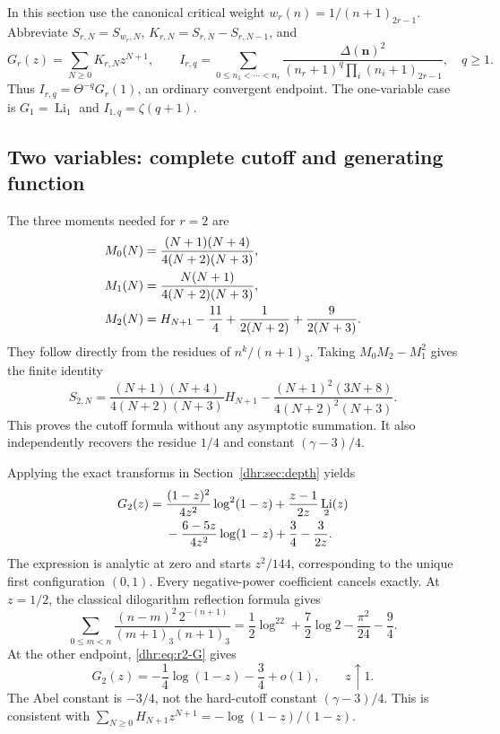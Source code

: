 \documentclass[11pt,letterpaper]{article}
\numberwithin{equation}{section}
\theoremstyle{definition}\newtheorem{definition}[theorem]{Definition}
\theoremstyle{remark}\newtheorem{remark}[theorem]{Remark}
\DeclareMathOperator{\Li}{Li}
\begin{document}
In this section use the canonical critical weight
$w_r(n)=1/(n+1)_{2r-1}$. Abbreviate $S_{r,N}=S_{w_r,N}$,
$K_{r,N}=S_{r,N}-S_{r,N-1}$, and
\begin{equation}\label{dhr:eq:canonical-GI}
 G_r(z)=\sum_{N\geq0}K_{r,N}z^{N+1},\qquad
 I_{r,q}=\sum_{0\leq n_1<\cdots<n_r}
 \frac{\Delta(\bm n)^2}
 {(n_r+1)^q\prod_i(n_i+1)_{2r-1}},\quad q\geq1.
\end{equation}
Thus $I_{r,q}=\Theta^{-q}G_r(1)$, an ordinary convergent endpoint.
The one-variable case is $G_1=\Li_1$ and $I_{1,q}=\zeta(q+1)$.

\subsection{Two variables: complete cutoff and generating function}
The three moments needed for $r=2$ are
\begin{align}
 M_0(N)&=\frac{(N+1)(N+4)}{4(N+2)(N+3)},\notag\\
 M_1(N)&=\frac{N(N+1)}{4(N+2)(N+3)},\notag\\
 M_2(N)&=H_{N+1}-\frac{11}{4}
                      +\frac1{2(N+2)}+\frac9{2(N+3)}.
 \label{dhr:eq:r2-moments}
\end{align}
They follow directly from the residues of $n^k/(n+1)_3$.
Taking $M_0M_2-M_1^2$ gives the finite identity
\begin{equation}\label{dhr:eq:r2-cutoff}
 \boxed{S_{2,N}=
 \frac{(N+1)(N+4)}{4(N+2)(N+3)}H_{N+1}
 -\frac{(N+1)^2(3N+8)}{4(N+2)^2(N+3)}.}
\end{equation}
This proves the cutoff formula without any asymptotic summation.
It also independently recovers the residue $1/4$ and constant
$(\gamma-3)/4$.

Applying the exact transforms in Section~\ref{dhr:sec:depth} yields
\begin{align}
 G_2(z)={}&\frac{(1-z)^2}{4z^2}\log^2(1-z)
        +\frac{z-1}{2z}\Li_2(z)\notag\\
 &-\frac{6-5z}{4z^2}\log(1-z)+\frac34-\frac3{2z}.
 \label{dhr:eq:r2-G}
\end{align}
The expression is analytic at zero and starts $z^2/144$,
corresponding to the unique first configuration $(0,1)$.
Every negative-power coefficient cancels exactly.
At $z=1/2$, the classical dilogarithm reflection formula
\cite{dlmf:polylog} gives
\begin{equation}\label{dhr:eq:G-half}
 \sum_{0\leq m<n}\frac{(n-m)^2\,2^{-(n+1)}}{(m+1)_3(n+1)_3}
 =\frac12\log^22+\frac72\log2-\frac{\pi^2}{24}-\frac94.
\end{equation}
At the other endpoint, \eqref{dhr:eq:r2-G} gives
\begin{equation}\label{dhr:eq:Abel-constant}
 G_2(z)=-\frac14\log(1-z)-\frac34+o(1),\qquad z\uparrow1.
\end{equation}
The Abel constant is $-3/4$, not the hard-cutoff constant
$(\gamma-3)/4$. This is consistent with
$\sum_{N\geq0}H_{N+1}z^{N+1}=-\log(1-z)/(1-z)$.
\end{document}
